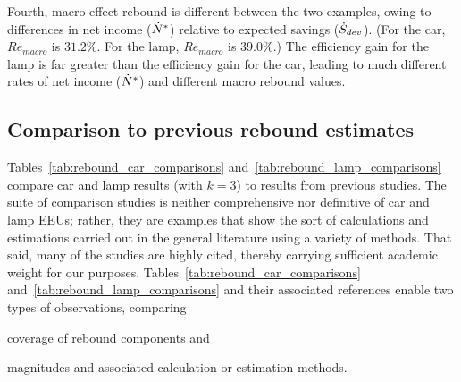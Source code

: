 \documentclass[12pt]{article}\usepackage[]{graphicx}\usepackage[]{xcolor}
\begin{document}
Fourth,
macro effect rebound is different between the two examples,
owing to differences in net income (${\dot{N}}^*$) relative to expected savings ($\dot{S}_{dev}$).
(For the car, $Re_{macro}$ is $31.2$\%.
For the lamp, $Re_{macro}$ is $39.0$\%.)
The efficiency gain for the lamp is far greater than the efficiency gain for the car,
leading to much different rates of net income (${\dot{N}}^*$) and
different macro rebound values.


\subsection{Comparison to previous rebound estimates}
\label{sec:comparison_to_other_rebound_estimates}

Tables~\ref{tab:rebound_car_comparisons} and~\ref{tab:rebound_lamp_comparisons}
compare car and lamp results (with $k = 3$) to
results from previous studies.
The suite of comparison studies is neither comprehensive nor
definitive of car and lamp EEUs;
rather, they are examples that show the sort of calculations and estimations
carried out in the general literature using a variety of methods.
That said, many of the studies are highly cited,
thereby carrying sufficient academic weight for our purposes.
Tables~\ref{tab:rebound_car_comparisons}
and~\ref{tab:rebound_lamp_comparisons}
and their associated references
enable two types of observations, comparing
%
\begin{enumerate*}[label={(\roman*)}]

  \item coverage of rebound components and

  \item magnitudes and associated calculation or estimation methods.

\end{enumerate*}


\end{document}
